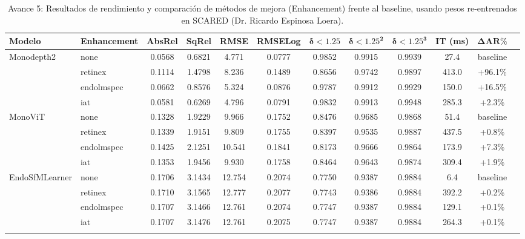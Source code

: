 \documentclass{article}
\begin{document}
\begin{table}[htbp]
\centering
\small
\setlength{\tabcolsep}{5pt}
\renewcommand{\arraystretch}{1.15} %

\caption{Avance 5: Resultados de rendimiento y comparación de métodos de mejora (Enhancement) frente al baseline, usando pesos re-entrenados en SCARED (Dr. Ricardo Espinosa Loera).}
\label{tab:resultados_avance5}

\begin{tabular}{llccccccccc@{\hspace{12pt}}l}
\toprule
\textbf{Modelo} & \textbf{Enhancement} & \textbf{AbsRel} & \textbf{SqRel} & \textbf{RMSE} & \textbf{RMSELog} & $\mathbf{\delta < 1.25}$ & $\mathbf{\delta < 1.25^2}$ & $\mathbf{\delta < 1.25^3}$ & \textbf{IT (ms)} & \textbf{$\mathbf{\Delta\text{AR}\%}$} & \\
\midrule

Monodepth2 & none       & 0.0568 & 0.6821 &  4.771 & 0.0777 & 0.9852 & 0.9915 & 0.9939 &  27.4 & baseline  & \\
           & retinex    & 0.1114 & 1.4798 &  8.236 & 0.1489 & 0.8656 & 0.9742 & 0.9897 & 413.0 & +96.1\%   & \\
           & endolmspec & 0.0662 & 0.8576 &  5.324 & 0.0876 & 0.9787 & 0.9912 & 0.9929 & 150.0 & +16.5\%   & \\
           & iat        & 0.0581 & 0.6269 &  4.796 & 0.0791 & 0.9832 & 0.9913 & 0.9948 & 285.3 &  +2.3\%   & \\
\addlinespace[0.8em]

MonoViT & none       & 0.1328 & 1.9229 &  9.966 & 0.1752 & 0.8476 & 0.9685 & 0.9868 &  51.4 & baseline  & \\
        & retinex    & 0.1339 & 1.9151 &  9.809 & 0.1755 & 0.8397 & 0.9535 & 0.9887 & 437.5 &  +0.8\%   & \\
        & endolmspec & 0.1425 & 2.1251 & 10.541 & 0.1841 & 0.8173 & 0.9666 & 0.9864 & 173.9 &  +7.3\%   & \\
        & iat        & 0.1353 & 1.9456 &  9.930 & 0.1758 & 0.8464 & 0.9643 & 0.9874 & 309.4 &  +1.9\%   & \\
\addlinespace[0.8em]

EndoSfMLearner & none       & 0.1706 & 3.1434 & 12.754 & 0.2074 & 0.7750 & 0.9387 & 0.9884 &   6.4 & baseline  & \\
               & retinex    & 0.1710 & 3.1565 & 12.777 & 0.2077 & 0.7743 & 0.9386 & 0.9884 & 392.2 &  +0.2\%   & \\
               & endolmspec & 0.1707 & 3.1466 & 12.761 & 0.2074 & 0.7747 & 0.9387 & 0.9884 & 129.1 &  +0.1\%   & \\
               & iat        & 0.1707 & 3.1476 & 12.761 & 0.2075 & 0.7747 & 0.9387 & 0.9884 & 264.3 &  +0.1\%   & \\
\addlinespace[0.8em]


\end{tabular}
\end{table}
\end{document}
